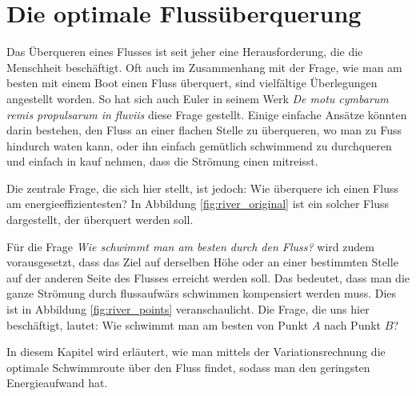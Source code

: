 %
%
%
%

\chapter{Die optimale Flussüberquerung\label{chapter:schwimmen}}
\begin{refsection}
%
%

\noindent
Das Überqueren eines Flusses ist seit jeher eine Herausforderung,
die die Menschheit beschäftigt. Oft auch im Zusammenhang mit der
%
Frage, wie man am besten mit einem Boot einen Fluss überquert, sind
%
vielfältige Überlegungen angestellt worden. So hat sich auch Euler
in seinem Werk \textit{De motu cymbarum remis propulsarum in fluviis}
\cite{schwimmen:Euler_works} diese Frage gestellt. Einige einfache
Ansätze könnten darin bestehen, den Fluss an einer flachen Stelle
zu überqueren, wo man zu Fuss hindurch waten kann, oder ihn einfach
gemütlich schwimmend zu durchqueren und einfach in kauf nehmen,
dass die Strömung einen mitreisst.
	
	
Die zentrale Frage, die sich hier stellt, ist jedoch: Wie überquere
ich einen Fluss am energieeffizientesten? In Abbildung
\ref{fig:river_original} ist ein solcher Fluss dargestellt, der
überquert werden soll.

%

Für die Frage \textit{Wie schwimmt man am besten durch den Fluss?}
wird zudem vorausgesetzt, dass das Ziel auf derselben Höhe oder an
einer bestimmten Stelle auf der anderen Seite des Flusses erreicht
werden soll. Das bedeutet, dass man die ganze Strömung durch
flussaufwärs schwimmen kompensiert werden muss. Dies ist in Abbildung
\ref{fig:river_points} veranschaulicht. Die Frage, die uns hier
beschäftigt, lautet: Wie schwimmt man am besten von Punkt \(A\)
nach Punkt \(B\)?

%

In diesem Kapitel wird erläutert, wie man mittels der Variationsrechnung
die optimale Schwimmroute über den Fluss findet, sodass man den
geringsten Energieaufwand hat.






\printbibliography[heading=subbibliography]
\end{refsection}


